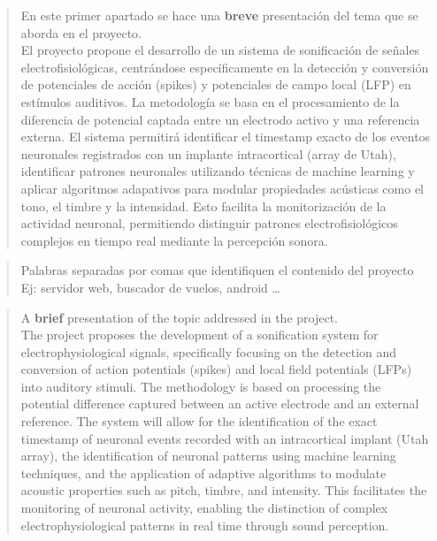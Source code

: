 \documentclass[a4paper,12pt,twoside]{memoir}
\begin{document}
\vfill



\newpage\null\thispagestyle{empty}\newpage




\frontmatter

\renewcommand*\abstractname{Resumen}
\begin{abstract}
En este primer apartado se hace una \textbf{breve} presentación del tema que se aborda en el proyecto. \\

El proyecto propone el desarrollo de un sistema de sonificación de señales electrofisiológicas, centrándose específicamente en la detección y conversión de potenciales de acción (spikes) y potenciales de campo local (LFP) en estímulos auditivos. La metodología se basa en el procesamiento de la diferencia de potencial captada entre un electrodo activo y una referencia externa. El sistema permitirá identificar el timestamp exacto de los eventos neuronales registrados con un implante intracortical (array de Utah), identificar patrones neuronales utilizando técnicas de machine learning y aplicar algoritmos adapativos para modular propiedades acústicas como el tono, el timbre y la intensidad. Esto facilita la monitorización de la actividad neuronal, permitiendo distinguir patrones electrofisiológicos complejos en tiempo real mediante la percepción sonora.

\end{abstract}

\renewcommand*\abstractname{Descriptores}
\begin{abstract}
Palabras separadas por comas que identifiquen el contenido del proyecto Ej: servidor web, buscador de vuelos, android \ldots
\end{abstract}

\clearpage

\renewcommand*\abstractname{Abstract}
\begin{abstract}
A \textbf{brief} presentation of the topic addressed in the project. \\

The project proposes the development of a sonification system for electrophysiological signals, specifically focusing on the detection and conversion of action potentials (spikes) and local field potentials (LFPs) into auditory stimuli. The methodology is based on processing the potential difference captured between an active electrode and an external reference. The system will allow for the identification of the exact timestamp of neuronal events recorded with an intracortical implant (Utah array), the identification of neuronal patterns using machine learning techniques, and the application of adaptive algorithms to modulate acoustic properties such as pitch, timbre, and intensity. This facilitates the monitoring of neuronal activity, enabling the distinction of complex electrophysiological patterns in real time through sound perception.

\end{abstract}
\end{document}

